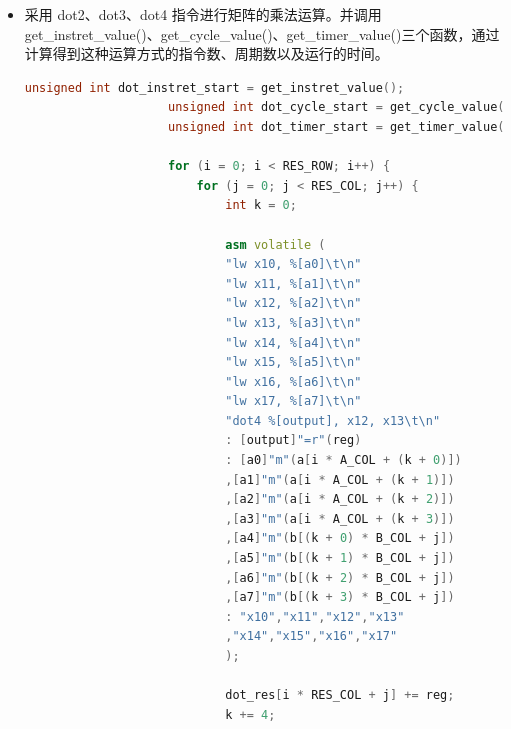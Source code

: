 \documentclass[a4paper, 14pt, oneside]{book} %
\numberwithin{equation}{subsection}
\begin{document}
\begin{itemize}
\begin{lstlisting}[language={C++}]
					printf("Matrix multiplication without using custom DOT instruction:
					\n");
					unsigned int no_dot_instret_start = get_instret_value();
					unsigned int no_dot_cycle_start = get_cycle_value();
					unsigned int no_dot_timer_start = get_timer_value();
					for (i = 0; i < RES_ROW; i++) {
						for (j = 0; j < RES_COL; j++) {
							for (k = 0; k < CONST_K; k++) {
								no_dot_res[i * RES_COL + j] += a[i * A_COL + k] * b[k *
								B_COL + j];
							}
						}
					}
					unsigned int no_dot_timer_cost = get_timer_value() -
					no_dot_timer_start;
					unsigned int no_dot_cycle_cost = get_cycle_value() -
					no_dot_cycle_start;
					unsigned int no_dot_instret_cost = get_instret_value() -
					no_dot_instret_start;
					printf("not_dot time cost: %0.2fms\n",
					(float)no_dot_timer_cost/RTC_FREQ*1000);
					printf("not_dot_cycle: %u\n", no_dot_cycle_cost);
					printf("not_dot_instret: %u\n", no_dot_instret_cost);
					printf("not_dot CPI: %.2f\n\n",
					(float)no_dot_cycle_cost/no_dot_instret_cost);	
				\end{lstlisting}
				\item 采用 dot2、dot3、dot4 指令进行矩阵的乘法运算。并调用 get\_instret\_value()、get\_cycle\_value()、get\_timer\_value()三个函数，通过计算得到这种运算方式的指令数、周期数以及运行的时间。
				\begin{lstlisting}[language={C++}]
					unsigned int dot_instret_start = get_instret_value();
					unsigned int dot_cycle_start = get_cycle_value();
					unsigned int dot_timer_start = get_timer_value(); 
					
					for (i = 0; i < RES_ROW; i++) {
						for (j = 0; j < RES_COL; j++) {
							int k = 0;
							
							asm volatile (
							"lw x10, %[a0]\t\n"
							"lw x11, %[a1]\t\n"
							"lw x12, %[a2]\t\n"
							"lw x13, %[a3]\t\n"
							"lw x14, %[a4]\t\n"
							"lw x15, %[a5]\t\n"
							"lw x16, %[a6]\t\n"
							"lw x17, %[a7]\t\n"
							"dot4 %[output], x12, x13\t\n"
							: [output]"=r"(reg)
							: [a0]"m"(a[i * A_COL + (k + 0)])
							,[a1]"m"(a[i * A_COL + (k + 1)])
							,[a2]"m"(a[i * A_COL + (k + 2)])
							,[a3]"m"(a[i * A_COL + (k + 3)])
							,[a4]"m"(b[(k + 0) * B_COL + j])
							,[a5]"m"(b[(k + 1) * B_COL + j])
							,[a6]"m"(b[(k + 2) * B_COL + j])
							,[a7]"m"(b[(k + 3) * B_COL + j])
							: "x10","x11","x12","x13"
							,"x14","x15","x16","x17"
							);
							
							dot_res[i * RES_COL + j] += reg;
							k += 4;
							

\end{lstlisting}
\end{itemize}
\end{document}

